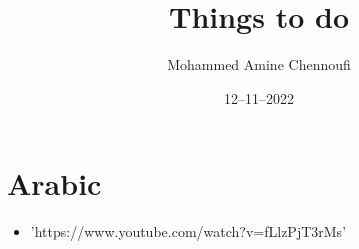 \documentclass[12pt]{extarticle}
\title{Things to do}
\date{12--11--2022}
\author{Mohammed Amine Chennoufi}
\begin{document}
\maketitle
\section{Arabic}
\begin{itemize}
	\item 'https://www.youtube.com/watch?v=fLlzPjT3rMs'
\end{itemize}
\end{document}
